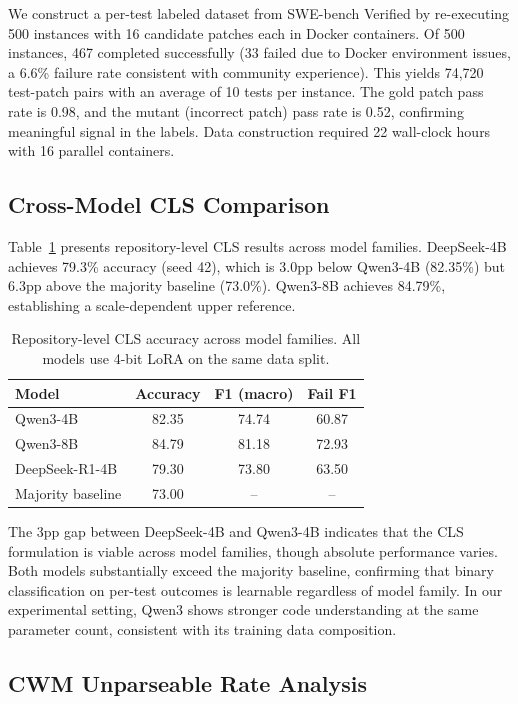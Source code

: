 \documentclass[11pt]{article}
\begin{document}
We construct a per-test labeled dataset from SWE-bench Verified by re-executing 500 instances with 16 candidate patches each in Docker containers. Of 500 instances, 467 completed successfully (33 failed due to Docker environment issues, a 6.6\% failure rate consistent with community experience). This yields 74,720 test-patch pairs with an average of 10 tests per instance. The gold patch pass rate is 0.98, and the mutant (incorrect patch) pass rate is 0.52, confirming meaningful signal in the labels. Data construction required 22 wall-clock hours with 16 parallel containers.

\subsection{Cross-Model CLS Comparison}
\label{sec:cls-comparison}

Table~\ref{tab:cls-comparison} presents repository-level CLS results across model families. DeepSeek-4B achieves 79.3\% accuracy (seed 42), which is 3.0pp below Qwen3-4B (82.35\%) but 6.3pp above the majority baseline (73.0\%). Qwen3-8B achieves 84.79\%, establishing a scale-dependent upper reference.

\begin{table}[t]
\centering
\caption{Repository-level CLS accuracy across model families. All models use 4-bit LoRA on the same data split.}
\label{tab:cls-comparison}
\begin{tabular}{lccc}
\toprule
Model & Accuracy & F1 (macro) & Fail F1 \\
\midrule
Qwen3-4B & 82.35 & 74.74 & 60.87 \\
Qwen3-8B & 84.79 & 81.18 & 72.93 \\
DeepSeek-R1-4B & 79.30 & 73.80 & 63.50 \\
\midrule
Majority baseline & 73.00 & -- & -- \\
\bottomrule
\end{tabular}
\end{table}

The 3pp gap between DeepSeek-4B and Qwen3-4B indicates that the CLS formulation is viable across model families, though absolute performance varies. Both models substantially exceed the majority baseline, confirming that binary classification on per-test outcomes is learnable regardless of model family. In our experimental setting, Qwen3 shows stronger code understanding at the same parameter count, consistent with its training data composition.

\subsection{CWM Unparseable Rate Analysis}
\label{sec:cwm-analysis}
\end{document}
